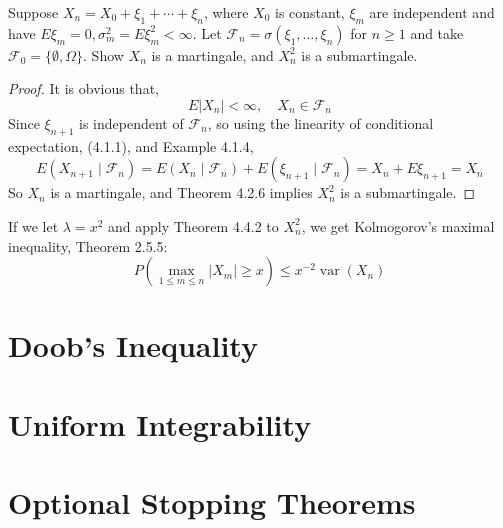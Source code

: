\begin{example}
    
\end{example}

\begin{example}
    
\end{example}

\begin{example}
    Suppose $X_{n}=X_{0}+\xi_{1}+\cdots+\xi_{n}$, where $X_{0}$ is constant, $\xi_{m}$ are independent and have $E\xi_{m}=0,\sigma_{m}^{2}=E\xi_{m}^{2}<\infty$. Let $\mathcal{F}_{n}=\sigma\left(\xi_{1},\ldots,\xi_{n}\right)$ for $n\geq 1$ and take $\mathcal{F}_{0}=\{\emptyset, \Omega\}$. Show $X_{n}$ is a martingale, and $X_{n}^{2}$ is a submartingale.
\end{example}

\begin{proof}
    It is obvious that,
    \begin{equation*}
        E\left|X_{n}\right|<\infty,\quad X_{n}\in\mathcal{F}_{n}
    \end{equation*}
    Since $\xi_{n+1}$ is independent of $\mathcal{F}_{n}$, so using the linearity of conditional expectation, (4.1.1), and Example 4.1.4,
    \begin{equation*}
        E\left(X_{n+1}\mid\mathcal{F}_{n}\right)=E\left(X_{n}\mid\mathcal{F}_{n}\right)+E\left(\xi_{n+1}\mid\mathcal{F}_{n}\right)=X_{n}+E\xi_{n+1}=X_{n}
    \end{equation*}
    So $X_{n}$ is a martingale, and Theorem 4.2.6 implies $X_{n}^{2}$ is a submartingale.
\end{proof}

\begin{note}
    If we let $\lambda=x^{2}$ and apply Theorem 4.4.2 to $X_{n}^{2}$, we get Kolmogorov's maximal inequality, Theorem 2.5.5:
    \begin{equation}
        P\left(\max_{1\leq m\leq n}\left|X_{m}\right|\geq x\right)\leq x^{-2}\operatorname{var}\left(X_{n}\right)
    \end{equation}
\end{note}

\section{Doob's Inequality}

\begin{theorem}

\end{theorem}

\begin{theorem}

\end{theorem}

\begin{theorem}

\end{theorem}

\section{Uniform Integrability}

\section{Optional Stopping Theorems}
